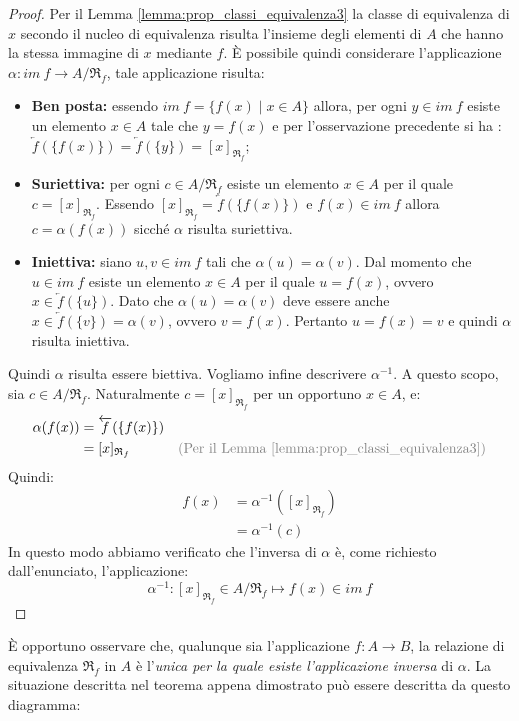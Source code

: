 \begin{proof}
	Per il Lemma \ref{lemma:prop_classi_equivalenza3} la classe di equivalenza di $x$ secondo il nucleo di equivalenza risulta l'insieme degli elementi di $A$ che hanno la stessa immagine di $x$ mediante $f$. È possibile quindi considerare l'applicazione $\alpha: im \ f \longrightarrow A/{\mathfrak{R}_{f}}$, tale applicazione risulta:
	\begin{itemize}
		\item \textbf{Ben posta:} essendo $im \ f = \{f(x) \; | \; x \in A \}$ allora, per ogni $y \in im \ f $ esiste un elemento $x \in A$ tale che $y=f(x)$ e per l'osservazione precedente si ha : $\overleftarrow{f}(\{f(x)\}) = \overleftarrow{f}(\{y\}) = [x]_{\mathfrak{R}_{f}}$;
		\item \textbf{Suriettiva:} per ogni $c \in A/\mathfrak{R}_{f}$ esiste un elemento $x \in A$ per il quale $c = [x]_{\mathfrak{R}_{f}}$. Essendo $[x]_{\mathfrak{R}_{f}}= \overleftarrow{f}(\{f(x)\})$ e $f(x) \in im \ f$ allora $c = \alpha(f(x))$ sicché $\alpha$ risulta suriettiva.
		\item \textbf{Iniettiva:} siano $u,v \in im \ f $ tali che $\alpha(u) = \alpha(v)$. Dal momento che $u \in im \ f $ esiste un elemento $x \in A$ per il quale $u=f(x)$, ovvero $x \in \overleftarrow{f}(\{u\})$. Dato che $\alpha(u)=\alpha(v)$ deve essere anche $x \in  \overleftarrow{f}(\{v\}) = \alpha(v)$, ovvero $v = f(x)$. Pertanto $u = f(x) =v$ e quindi $\alpha$ risulta iniettiva.
	\end{itemize}
Quindi $\alpha$ risulta essere biettiva. Vogliamo infine descrivere $\alpha^{-1}$. A questo scopo, sia $c \in A/{\mathfrak{R}_{f}}$. Naturalmente $c = [x]_{\mathfrak{R}_{f}}$ per un opportuno $x \in A$, e:
\begin{align*}
	\alpha(f(x)) &= \overleftarrow{f}(\{f(x)\})\\ 
	&= [x]_{\mathfrak{R}_{f}} & \text{\textcolor{gray}{(Per il Lemma \ref{lemma:prop_classi_equivalenza3})}}
\end{align*}
Quindi:
\begin{align*}
	f(x) &= \alpha^{-1}([x]_{\mathfrak{R}_{f}})\\
	&= \alpha^{-1}(c)
\end{align*}
In questo modo abbiamo verificato che l'inversa di $\alpha$ è, come richiesto dall'enunciato, l'applicazione:
$$\alpha^{-1} : [x]_{\mathfrak{R}_{f}} \in A/{\mathfrak{R}_{f}} \mapsto f(x) \in im \ f$$
\end{proof}

È opportuno osservare che, qualunque sia l'applicazione $f: A \rightarrow B$, la relazione di equivalenza $\mathfrak{R}_{f}$ in $A$ è l'\textit{unica per la quale esiste l'applicazione inversa} di $\alpha$. La situazione descritta nel teorema appena dimostrato può essere descritta da questo diagramma:
\begin{center}	
\end{center}

